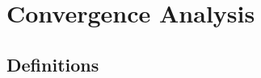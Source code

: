 \documentclass[10pt,twocolumn,journal]{IEEEtran}
\begin{document}

\section{Convergence Analysis}\label{sec:conv_analysis}

\subsection{Definitions}\label{sec:def}
\end{document}
